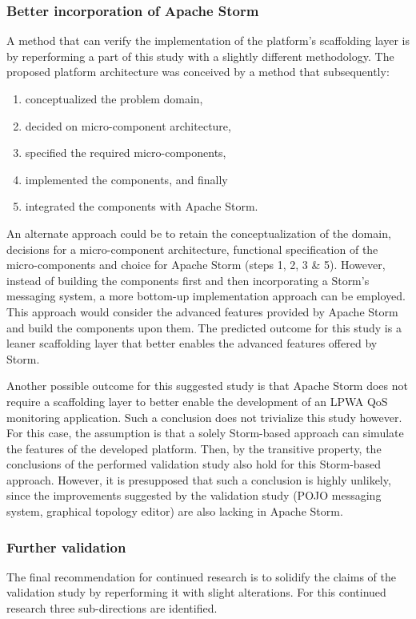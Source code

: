 \subsubsection{Better incorporation of Apache Storm}
A method that can verify the implementation of the  platform's scaffolding layer is by reperforming a part of this study with a slightly different methodology. The proposed platform architecture was conceived by a method that subsequently:
\begin{enumerate}
\nospace
\item conceptualized the problem domain,
\item decided on micro-component architecture,
\item specified the required micro-components,
\item implemented the components, and finally
\item integrated the components with Apache Storm.
\end{enumerate}
An alternate approach could be to retain the conceptualization of the domain, decisions for a micro-component architecture, functional specification of the micro-components and choice for Apache Storm (steps 1, 2, 3 \& 5). However, instead of building the components first and then incorporating a Storm's messaging system, a more bottom-up implementation approach can be employed. This approach would consider the advanced features provided by Apache Storm and build the components upon them. The predicted outcome for this study is a leaner scaffolding layer that better enables the advanced features offered by Storm.

Another possible outcome for this suggested study is that Apache Storm does not require a scaffolding layer to better enable the development of an LPWA QoS monitoring application. Such a conclusion does not trivialize this study however. For this case, the assumption is that a solely Storm-based approach can simulate the features of the developed platform. Then, by the transitive property, the conclusions of the performed validation study also hold for this Storm-based approach. However, it is presupposed that such a conclusion is highly unlikely, since the improvements suggested by the validation study (POJO messaging system, graphical topology editor) are also lacking in Apache Storm.

\subsubsection{Further validation}
The final recommendation for continued research is to solidify the claims of the validation study by reperforming it with slight alterations. For this continued research three sub-directions are identified.

